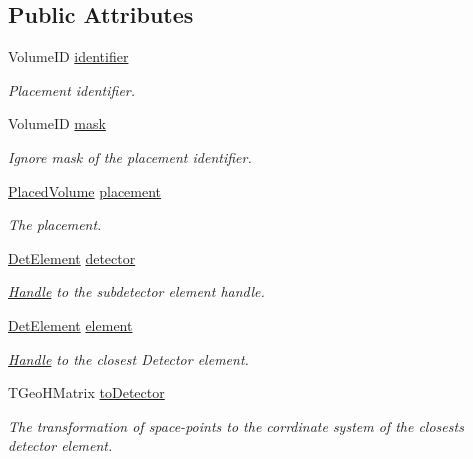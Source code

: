 \subsection*{Public Attributes}
\begin{DoxyCompactItemize}
\item 
Volume\+ID \hyperlink{class_d_d4hep_1_1_geometry_1_1_volume_manager_context_a22e82a0219d1d0249ea2d1b034ef7264}{identifier}
\begin{DoxyCompactList}\small\item\em Placement identifier. \end{DoxyCompactList}\item 
Volume\+ID \hyperlink{class_d_d4hep_1_1_geometry_1_1_volume_manager_context_a052bc7df447cef84eabe15a5751e772b}{mask}
\begin{DoxyCompactList}\small\item\em Ignore mask of the placement identifier. \end{DoxyCompactList}\item 
\hyperlink{class_d_d4hep_1_1_geometry_1_1_placed_volume}{Placed\+Volume} \hyperlink{class_d_d4hep_1_1_geometry_1_1_volume_manager_context_aa6c87ac47a16aa5094ca87d5991ab91f}{placement}
\begin{DoxyCompactList}\small\item\em The placement. \end{DoxyCompactList}\item 
\hyperlink{class_d_d4hep_1_1_geometry_1_1_det_element}{Det\+Element} \hyperlink{class_d_d4hep_1_1_geometry_1_1_volume_manager_context_a4b637a36900149ff3490731f62ca1d52}{detector}
\begin{DoxyCompactList}\small\item\em \hyperlink{class_d_d4hep_1_1_handle}{Handle} to the subdetector element handle. \end{DoxyCompactList}\item 
\hyperlink{class_d_d4hep_1_1_geometry_1_1_det_element}{Det\+Element} \hyperlink{class_d_d4hep_1_1_geometry_1_1_volume_manager_context_a57c697291054cc0fa221f047dd32938f}{element}
\begin{DoxyCompactList}\small\item\em \hyperlink{class_d_d4hep_1_1_handle}{Handle} to the closest Detector element. \end{DoxyCompactList}\item 
T\+Geo\+H\+Matrix \hyperlink{class_d_d4hep_1_1_geometry_1_1_volume_manager_context_a0978a0bffd0e0669f14d0ddea43ea6bb}{to\+Detector}
\begin{DoxyCompactList}\small\item\em The transformation of space-\/points to the corrdinate system of the closests detector element. \end{DoxyCompactList}\item 

\end{DoxyCompactItemize}
